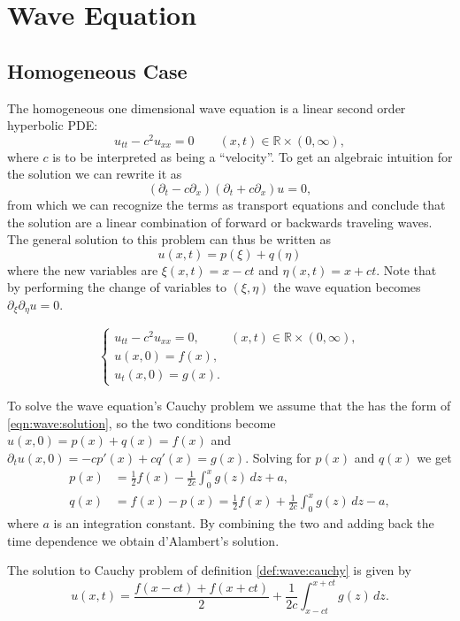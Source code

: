 
\section{Wave Equation}

\subsection{Homogeneous Case}

The homogeneous one dimensional wave equation is a linear second order
hyperbolic PDE:
\[
  u_{tt} - c^2 u_{xx} = 0
  \qquad (x, t) \in \mathbb{R} \times (0, \infty),
\]
where $c$ is to be interpreted as being a ``velocity''. To get an algebraic
intuition for the solution we can rewrite it as
\[
  (\partial_t - c\partial_x)(\partial_t + c\partial_x) u = 0,
\]
from which we can recognize the terms as transport equations and conclude that
the solution are a linear combination of forward or backwards traveling
waves. The general solution to this problem can thus be written as
\begin{equation} \label{eqn:wave:solution}
  u(x,t) = p(\xi) + q(\eta)
\end{equation}
where the new variables are $\xi(x,t) = x - ct$ and $\eta(x,t) = x + ct$.
Note that by performing the change of variables to $(\xi,\eta)$ the wave
equation becomes $\partial_\xi \partial_\eta u = 0$.

\begin{defn}
  \label{def:wave:cauchy}
  \[
    \begin{cases}
      u_{tt} - c^2 u_{xx} = 0, & (x, t) \in \mathbb{R} \times (0, \infty), \\
      u(x,0) = f(x), \\
      u_t(x,0) = g(x).
    \end{cases}
  \]
\end{defn}

To solve the wave equation's Cauchy problem we assume that the has the form of 
\eqref{eqn:wave:solution}, so the two conditions become $u(x,0) = p(x) + q(x)
= f(x)$ and $\partial_t u(x,0) = -c p'(x) + c q'(x) = g(x)$. Solving for
$p(x)$ and $q(x)$ we get
\begin{align*}
  p(x) &= \frac{1}{2}f(x) - \frac{1}{2c}\int_0^x g(z) \, dz + a, \\
  q(x) &= f(x) - p(x) = \frac{1}{2}f(x) + \frac{1}{2c} \int_0^x g(z) \, dz -a,
\end{align*}
where $a$ is an integration constant. By combining the two and adding back the
time dependence we obtain d'Alambert's solution.
\begin{thm}
  The solution to Cauchy problem of definition \ref{def:wave:cauchy} is given
  by
  \[
    u(x,t) = \frac{f(x-ct) + f(x+ct)}{2} 
      + \frac{1}{2c} \int_{x-ct}^{x+ct} g(z) \,dz.
  \]
\end{thm}


